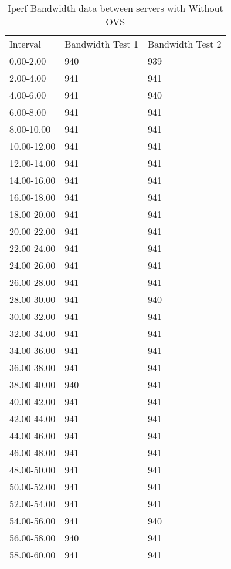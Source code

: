\begin{table}[]
	\centering
	\caption{Iperf Bandwidth data between servers with Without OVS}
	\label{tab:iperf_server_server_no_ovs}
	\begin{tabular}{lll}
		Interval    & Bandwidth Test 1 & Bandwidth Test 2 \\
		0.00-2.00   & 940              & 939              \\
		2.00-4.00   & 941              & 941              \\
		4.00-6.00   & 941              & 940              \\
		6.00-8.00   & 941              & 941              \\
		8.00-10.00  & 941              & 941              \\
		10.00-12.00 & 941              & 941              \\
		12.00-14.00 & 941              & 941              \\
		14.00-16.00 & 941              & 941              \\
		16.00-18.00 & 941              & 941              \\
		18.00-20.00 & 941              & 941              \\
		20.00-22.00 & 941              & 941              \\
		22.00-24.00 & 941              & 941              \\
		24.00-26.00 & 941              & 941              \\
		26.00-28.00 & 941              & 941              \\
		28.00-30.00 & 941              & 940              \\
		30.00-32.00 & 941              & 941              \\
		32.00-34.00 & 941              & 941              \\
		34.00-36.00 & 941              & 941              \\
		36.00-38.00 & 941              & 941              \\
		38.00-40.00 & 940              & 941              \\
		40.00-42.00 & 941              & 941              \\
		42.00-44.00 & 941              & 941              \\
		44.00-46.00 & 941              & 941              \\
		46.00-48.00 & 941              & 941              \\
		48.00-50.00 & 941              & 941              \\
		50.00-52.00 & 941              & 941              \\
		52.00-54.00 & 941              & 941              \\
		54.00-56.00 & 941              & 940              \\
		56.00-58.00 & 940              & 941              \\
		58.00-60.00 & 941              & 941             
	\end{tabular}
\end{table}


